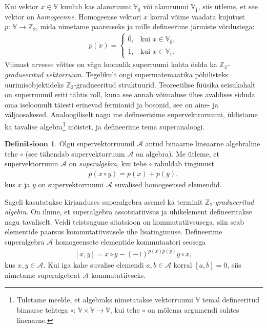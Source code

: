 \documentclass[12pt,a4paper,oneside]{article}
\theoremstyle{plain}
\theoremstyle{definition}
\newtheorem{definitsioon}{Definitsioon}[section]
\numberwithin{equation}{section}
\def\V{{\mathbb V}}
\def\Z{{\mathbb Z}}
\def\A{{\mathcal A}}
\begin{document}
Kui vektor $x \in \V$ kuulub kas alamruumi $\V_{\overline{0}}$ või 
alamruumi $\V_{\overline{1}}$, siis ütleme, et see vektor on 
\emph{homogeenne}. Homogeense vektori $x$ korral võime vaadata 
kujutust $p \colon\, \V \rightarrow \Z_2$, mida nimetame paarsuseks ja mille 
defineerime järmiste võrdustega:
\begin{align*}
p\left(x\right) = \begin{cases}
    \overline{0},& \text{kui $x \in \V_{\overline{0}}$},\\
    \overline{1},& \text{kui $x \in \V_{\overline{1}}$}.
  \end{cases}
\end{align*}
Viimast arvesse võttes on väga loomulik superruumi kohta öelda ka 
\emph{$\Z_2$-graduee\-ritud vektorruum}. Tegelikult ongi 
supermatemaatika põhilisteks uurimisobjektideks $\Z_2$-gradueeritud 
struktuurid. Teoreetilise füüsika seisukohalt on superruumil 
eriti tähtis roll, kuna see annab võimaluse ühes avaldises 
siduda oma iseloomult täiesti erinevad fermionid ja bosonid, 
see on aine- ja väljaosakesed. Analoogiliselt nagu me defineerisime 
supervektroruumi, üldistame ka tavalise algebra\footnote{
Tuletame meelde, et algebraks nimetatakse 
vektorruumi $\V$ temal defineeritud binaarse tehtega 
$\circ \colon\, \V \times \V \rightarrow \V$, kui tehe $\circ$ on mõlema 
argumendi suhtes lineaarne.} mõistet, ja defineerime 
tema superanaloogi.

\begin{definitsioon}
Olgu supervektorruumil $\A$ antud binaarne lineaarne algebraline 
tehe $\circ$ (see tähendab supervektorruum $\A$ on algebra). Me 
ütleme, et supervektorruum $\A$ on \emph{superalgebra}, kui tehe 
$\circ$ rahuldab tingimust
\begin{align*}
p\left(x \circ y\right) = p\left(x\right) + p\left(y\right),
\end{align*}
kus $x$ ja $y$ on supervektorruumi $\A$ suvalised homogeensed 
elemendid.
\end{definitsioon}

Sageli kasutatakse kirjanduses superalgebra asemel ka terminit 
\emph{$\Z_2$-gradueeritud algebra}. On ilmne, et superalgebra
assotsiatiivsus ja ühikelement defineeritakse nagu tavaliselt. 
Veidi teistsugune sitatsioon on kommutatiivsusega, siin seab 
elementide paarsus kommutatiivsusele ühe lisatingimuse. Defineerime 
superalgebra $\A$ homogeensete elementide kommutaatori seosega
\begin{align*}
\left[x, y\right] = x \circ y - 
\left(-1\right)^{p\left(x\right) p\left(y\right)} y \circ x,
\end{align*}
kus $x, y \in \A$. Kui iga kahe suvalise elemendi $a, b \in \A$ 
korral $\left[a, b\right] = 0$, siis nimetame superalgebrat $\A$ 
kommutatiivseks.
\end{document}
